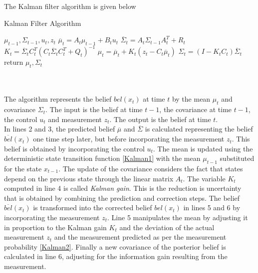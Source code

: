 \documentclass[conference]{IEEEtran}
\begin{document}
The Kalman filter algorithm is given below

\begin{minipage}{\linewidth}
  \begin{algorithm}[H]
    \caption{Kalman Filter Algorithm}\label{AlgKalman}
    \begin{algorithmic}[1]
       {$\mu_{t-1},\Sigma_{t-1}, u_t,z_t$}
	\State $\overline \mu_t = A_t \mu_{t-1} + B_t u_t$
	\State $\overline \Sigma_t= A_t \Sigma_{t-1} A_t^T + R_t$  
	\State $K_t = \overline \Sigma_t C_t^T{(C_t \overline \Sigma_t C_t^T + Q_t)}^{-1}$
	\State $\mu_t = \overline \mu_t + K_t(z_t - C_t \overline \mu_t)$
	\State $\Sigma_t = (I - K_t C_t) \overline \Sigma_t$
	\State return $\mu_t, \Sigma_t$
      \EndProcedure
    \end{algorithmic}
  \end{algorithm}
\end{minipage}\\\\

The algorithm represents the belief $bel(x_t)$ at time $t$ by the mean $\mu_t$ and covariance $\Sigma_t$. The input is the belief at time $t-1$, the covariance at time $t-1$, the control $u_t$ and measurement $z_t$. The output is the belief at time $t$.\\

In lines 2 and 3, the predicted belief $\overline \mu$ and $\overline \Sigma$ is calculated representing the belief $\overline{bel}(x_t)$ one time step later, but before incorporating the measurement $z_t$. This belief is obtained by incorporating the control $u_t$. The mean is updated using the deterministic state transition function \ref{Kalman1} with the mean $\mu_{t-1}$ substituted for the state $x_{t-1}$. The update of the covariance considers the fact that states depend on the previous state through the linear matrix $A_t$. The variable $K_t$ computed in line 4 is called \textit{Kalman gain}. This is the reduction is uncertainty that is obtained by combining the prediction and correction steps. The belief $\overline{bel}(x_t)$ is transformed into the corrected belief ${bel}(x_t)$ in lines 5 and 6 by incorporating the measurement $z_t$. Line 5 manipulates the mean by adjusting it in proportion to the Kalman gain $K_t$ and the deviation of the actual measurement $z_t$ and the measurement predicted as per the measurement probability \ref{Kalman2}. Finally a new covariance of the posterior belief is calculated in line 6, adjusting for the information gain resulting from the measurement.\\
\end{document}
